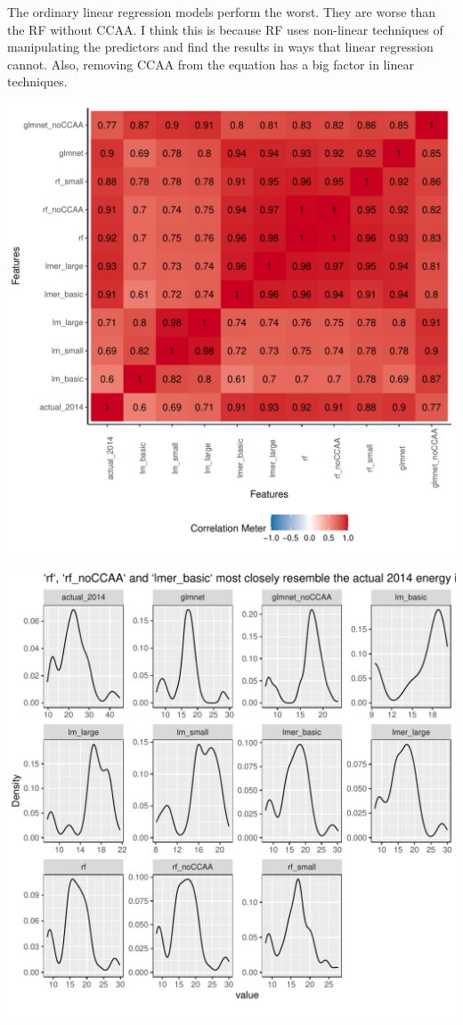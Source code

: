 \documentclass[
]{report}
\begin{document}
The ordinary linear regression models perform the worst. They are worse
than the RF without CCAA. I think this is because RF uses non-linear
techniques of manipulating the predictors and find the results in ways
that linear regression cannot. Also, removing CCAA from the equation has
a big factor in linear techniques.

\includegraphics{Modelling_Energy_Intensity-V3_files/figure-pdf/unnamed-chunk-16-1.pdf}

\includegraphics{Modelling_Energy_Intensity-V3_files/figure-pdf/unnamed-chunk-16-2.pdf}
\end{document}
